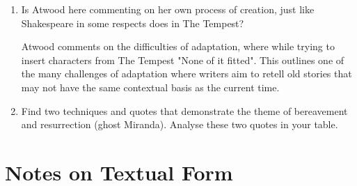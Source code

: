 			\begin{enumerate}
				\item Is Atwood here commenting on her own process of creation, just like Shakespeare in some respects does in The Tempest?

					Atwood comments on the difficulties of adaptation, where while trying to insert characters from The Tempest "None of it fitted". This outlines one of the many challenges of adaptation where writers aim to retell old stories that may not have the same contextual basis as the current time.
				\item Find two techniques and quotes that demonstrate the theme of bereavement and resurrection (ghost Miranda). Analyse these two quotes in your table.

			\end{enumerate}

\section{Notes on Textual Form}

